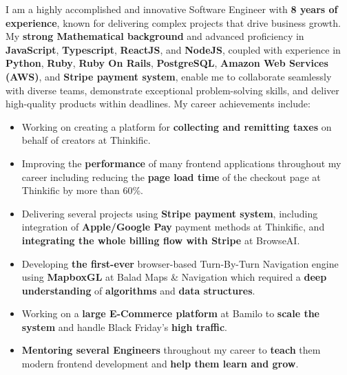 I am a highly accomplished and innovative Software Engineer with \textbf{8 years of experience}, known for delivering complex projects that drive business growth. My \textbf{strong Mathematical background} and advanced proficiency in \textbf{JavaScript}, \textbf{Typescript}, \textbf{ReactJS}, and \textbf{NodeJS}, coupled with experience in \textbf{Python}, \textbf{Ruby}, \textbf{Ruby On Rails}, \textbf{PostgreSQL}, \textbf{Amazon Web Services (AWS)}, and \textbf{Stripe payment system}, enable me to collaborate seamlessly with diverse teams, demonstrate exceptional problem-solving skills, and deliver high-quality products within deadlines. My career achievements include:
\medskip
\begin{itemize}
    \item Working on creating a platform for \textbf{collecting and remitting taxes} on behalf of creators at Thinkific.
    \item Improving the \textbf{performance} of many frontend applications throughout my career including reducing the \textbf{page load time} of the checkout page at Thinkific by more than 60\%.
    \item Delivering several projects using \textbf{Stripe payment system}, including integration of \textbf{Apple/Google Pay} payment methods at Thinkific, and \textbf{integrating the whole billing flow with Stripe} at BrowseAI.
    \item Developing \textbf{the first-ever} browser-based Turn-By-Turn Navigation engine using \textbf{MapboxGL} at Balad Maps \& Navigation which required a \textbf{deep understanding} of \textbf{algorithms} and \textbf{data structures}.
    \item Working on a \textbf{large E-Commerce platform} at Bamilo to \textbf{scale the system} and handle Black Friday's \textbf{high traffic}.
    \item \textbf{Mentoring several Engineers} throughout my career to \textbf{teach} them modern frontend development and \textbf{help them learn and grow}.
\end{itemize}

